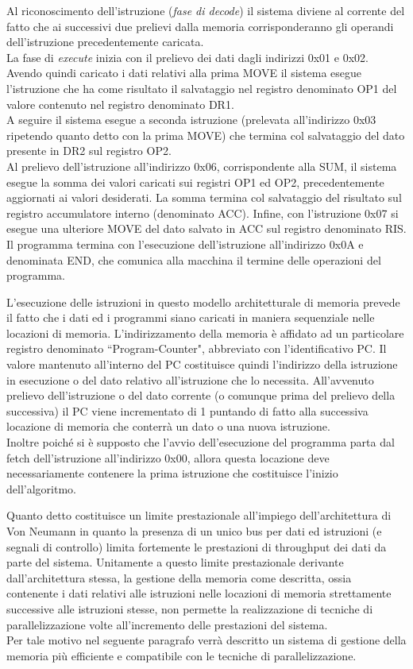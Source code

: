 Al riconoscimento dell'istruzione (\textit{fase di decode}) il sistema diviene al corrente del fatto che ai successivi due prelievi dalla memoria corrisponderanno gli operandi dell'istruzione precedentemente caricata.\\
La fase di \textit{execute} inizia con il prelievo dei dati dagli indirizzi 0x01 e 0x02. Avendo quindi caricato i dati relativi alla prima MOVE il sistema esegue l'istruzione che ha come risultato il salvataggio nel registro denominato OP1 del valore contenuto nel registro denominato DR1.\\
A seguire il sistema esegue a seconda istruzione (prelevata all'indirizzo 0x03 ripetendo quanto detto con la prima MOVE) che termina col salvataggio del dato presente in DR2 sul registro OP2.\\
Al prelievo dell'istruzione all'indirizzo 0x06, corrispondente alla SUM, il sistema esegue la somma dei valori caricati sui registri OP1 ed OP2, precedentemente aggiornati ai valori desiderati. La somma termina col salvataggio del risultato sul registro accumulatore interno (denominato ACC). Infine, con l'istruzione 0x07 si esegue una ulteriore MOVE del dato salvato in ACC sul registro denominato RIS.
Il programma termina con l'esecuzione dell'istruzione all'indirizzo 0x0A e denominata END, che comunica alla macchina il termine delle operazioni del programma.
\par \bigskip
\noindent
L'esecuzione delle istruzioni in questo modello architetturale di memoria prevede il fatto che i dati ed i programmi siano caricati in maniera sequenziale nelle locazioni di memoria. L'indirizzamento della memoria è affidato ad un particolare registro denominato \textquotedblleft Program-Counter", abbreviato con l'identificativo PC. Il valore mantenuto all'interno del PC costituisce quindi l'indirizzo della istruzione in esecuzione o del dato relativo all'istruzione che lo necessita. All'avvenuto prelievo dell'istruzione o del dato corrente (o comunque prima del prelievo della successiva) il PC viene incrementato di 1 puntando di fatto alla successiva locazione di memoria che conterrà un dato o una nuova istruzione.\\
Inoltre poiché si è supposto che l'avvio dell'esecuzione del programma parta dal fetch dell'istruzione all'indirizzo 0x00, allora questa locazione deve necessariamente contenere la prima istruzione che costituisce l'inizio dell'algoritmo.
\par \bigskip \noindent
Quanto detto costituisce un limite prestazionale all'impiego dell'architettura di Von Neumann in quanto la presenza di un unico bus per dati ed istruzioni (e segnali di controllo) limita fortemente le prestazioni di throughput dei dati da parte del sistema. Unitamente a questo limite prestazionale derivante dall'architettura stessa, la gestione della memoria come descritta, ossia contenente i dati relativi alle istruzioni nelle locazioni di memoria strettamente successive alle istruzioni stesse, non permette la realizzazione di tecniche di parallelizzazione volte all'incremento delle prestazioni del sistema.\\ Per tale motivo nel seguente paragrafo verrà descritto un sistema di gestione della memoria più efficiente e compatibile con le tecniche di parallelizzazione.

